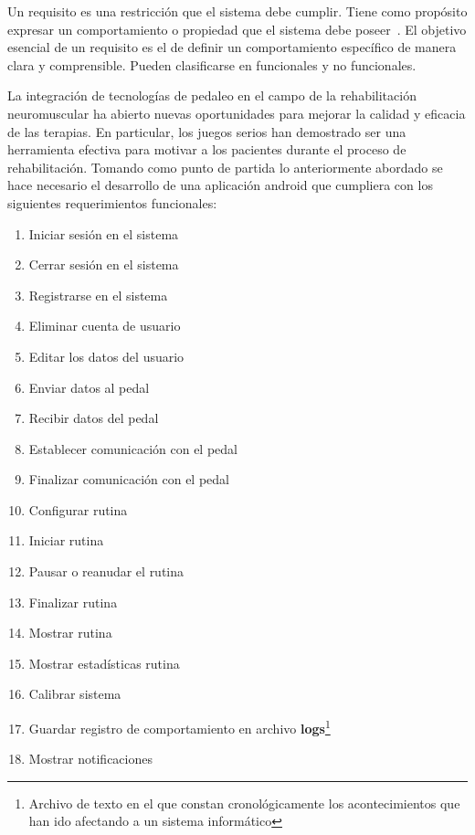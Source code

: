 Un requisito es una restricción que el sistema debe cumplir. Tiene como propósito expresar un comportamiento o propiedad que el sistema debe poseer~\cite{jacobson2000uml}. El objetivo esencial de un requisito es el de definir un comportamiento específico de manera clara y comprensible. Pueden clasificarse en funcionales y no funcionales.

La integración de tecnologías de pedaleo en el campo de la rehabilitación neuromuscular ha abierto nuevas oportunidades para mejorar la calidad y eficacia de las terapias. En particular, los juegos serios han demostrado ser una herramienta efectiva para motivar a los pacientes durante el proceso de rehabilitación. Tomando como punto de partida lo anteriormente abordado se hace necesario el desarrollo de una aplicación android que cumpliera con los siguientes requerimientos funcionales:    

\begin{enumerate}
    \item Iniciar sesión en el sistema
    \item Cerrar sesión en el sistema
    \item Registrarse en el sistema
    \item Eliminar cuenta de usuario
    \item Editar los datos del usuario
    \item Enviar datos al pedal
    \item Recibir datos del pedal
    \item Establecer comunicación con el pedal
    \item Finalizar comunicación con el pedal
    \item Configurar rutina
    \item Iniciar rutina
    \item Pausar o reanudar el rutina
    \item Finalizar rutina
    \item Mostrar rutina
    \item Mostrar estadísticas rutina
    \item Calibrar sistema
    \item Guardar registro de comportamiento en archivo \textbf{logs}\footnote{Archivo de texto en el que constan cronológicamente los acontecimientos que han ido afectando a un sistema informático}
    \item Mostrar notificaciones 
\end{enumerate}


